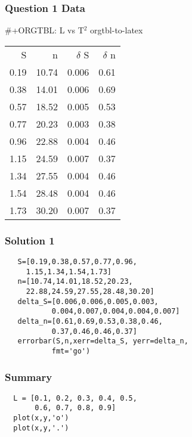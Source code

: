 \documentclass[presentation]{beamer}
\begin{document}
\begin{frame}
\frametitle{Question 1 Data}
\label{sec-13}


  \#+ORGTBL: L vs T$^2$ orgtbl-to-latex


\begin{center}
\begin{tabular}{rrrr}
    S  &      n  &  $\delta$ S  &  $\delta$ n  \\
 0.19  &  10.74  &       0.006  &        0.61  \\
 0.38  &  14.01  &       0.006  &        0.69  \\
 0.57  &  18.52  &       0.005  &        0.53  \\
 0.77  &  20.23  &       0.003  &        0.38  \\
 0.96  &  22.88  &       0.004  &        0.46  \\
 1.15  &  24.59  &       0.007  &        0.37  \\
 1.34  &  27.55  &       0.004  &        0.46  \\
 1.54  &  28.48  &       0.004  &        0.46  \\
 1.73  &  30.20  &       0.007  &        0.37  \\
\end{tabular}
\end{center}


  
  
    
\end{frame}
\begin{frame}[fragile]
\frametitle{Solution 1}
\label{sec-14}

  
\begin{verbatim}
   S=[0.19,0.38,0.57,0.77,0.96,
     1.15,1.34,1.54,1.73]
   n=[10.74,14.01,18.52,20.23,
     22.88,24.59,27.55,28.48,30.20]
   delta_S=[0.006,0.006,0.005,0.003,
           0.004,0.007,0.004,0.004,0.007]
   delta_n=[0.61,0.69,0.53,0.38,0.46,
           0.37,0.46,0.46,0.37]
   errorbar(S,n,xerr=delta_S, yerr=delta_n, 
           fmt='go')
\end{verbatim}
\end{frame}
\begin{frame}[fragile]
\frametitle{Summary}
\label{sec-15}

\begin{verbatim}
  L = [0.1, 0.2, 0.3, 0.4, 0.5,
       0.6, 0.7, 0.8, 0.9]  
  plot(x,y,'o')
  plot(x,y,'.')
\end{verbatim}
\end{frame}
\end{document}
